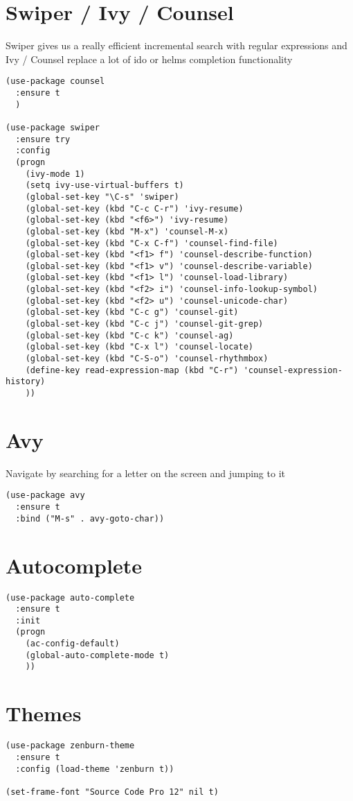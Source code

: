 \documentclass[11pt]{article}
\begin{document}
\section{Swiper / Ivy / Counsel}
\label{sec:org53f7965}
Swiper gives us a really efficient incremental search with regular
expressions and Ivy / Counsel replace a lot of ido or helms
completion functionality
\begin{verbatim}
(use-package counsel
  :ensure t
  )

(use-package swiper
  :ensure try
  :config
  (progn
    (ivy-mode 1)
    (setq ivy-use-virtual-buffers t)
    (global-set-key "\C-s" 'swiper)
    (global-set-key (kbd "C-c C-r") 'ivy-resume)
    (global-set-key (kbd "<f6>") 'ivy-resume)
    (global-set-key (kbd "M-x") 'counsel-M-x)
    (global-set-key (kbd "C-x C-f") 'counsel-find-file)
    (global-set-key (kbd "<f1> f") 'counsel-describe-function)
    (global-set-key (kbd "<f1> v") 'counsel-describe-variable)
    (global-set-key (kbd "<f1> l") 'counsel-load-library)
    (global-set-key (kbd "<f2> i") 'counsel-info-lookup-symbol)
    (global-set-key (kbd "<f2> u") 'counsel-unicode-char)
    (global-set-key (kbd "C-c g") 'counsel-git)
    (global-set-key (kbd "C-c j") 'counsel-git-grep)
    (global-set-key (kbd "C-c k") 'counsel-ag)
    (global-set-key (kbd "C-x l") 'counsel-locate)
    (global-set-key (kbd "C-S-o") 'counsel-rhythmbox)
    (define-key read-expression-map (kbd "C-r") 'counsel-expression-history)
    ))
\end{verbatim}

\section{Avy}
\label{sec:org766a91d}
Navigate by searching for a letter on the screen and jumping to it
\begin{verbatim}
(use-package avy
  :ensure t
  :bind ("M-s" . avy-goto-char))
\end{verbatim}

\section{Autocomplete}
\label{sec:orgbe43bcf}
\begin{verbatim}
(use-package auto-complete
  :ensure t
  :init
  (progn
    (ac-config-default)
    (global-auto-complete-mode t)
    ))
\end{verbatim}
\section{Themes}
\label{sec:orge19d008}
\begin{verbatim}
(use-package zenburn-theme
  :ensure t
  :config (load-theme 'zenburn t))

(set-frame-font "Source Code Pro 12" nil t)
\end{verbatim}
\end{document}
